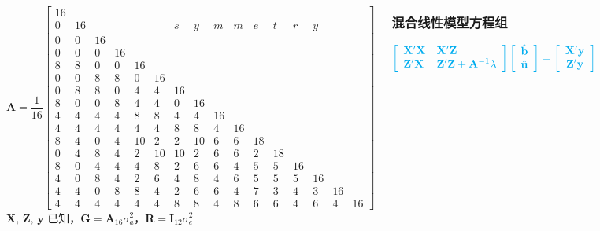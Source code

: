 \documentclass[serif,aspectratio=169]{beamer}
\begin{document}
\begin{frame}
\begin{columns}
\begin{frame}
  \begingroup
  \fontsize{8pt}{8pt}\selectfont
  $$
  \mathbf{A}=\frac{1}{16}\left[\begin{array}{rrrrrrrrrrrrrrrr}
      16\\
      0 & 16 &  &  &  & & s & y & m & m & e & t & r & y\\
      0 & 0 & 16\\
      0 & 0 & 0 & 16\\
      8 & 8 & 0 & 0 & 16\\
      0 & 0 & 8 & 8 & 0 & 16\\
      0 & 8 & 8 & 0 & 4 & 4 & 16\\
      8 & 0 & 0 & 8 & 4 & 4 & 0 & 16\\
      4 & 4 & 4 & 4 & 8 & 8 & 4 & 4 & 16\\
      4 & 4 & 4 & 4 & 4 & 4 & 8 & 8 & 4 & 16\\
      8 & 4 & 0 & 4 & 10 & 2 & 2 & 10 & 6 & 6 & 18\\
      0 & 4 & 8 & 4 & 2 & 10 & 10 & 2 & 6 & 6 & 2 & 18\\
      8 & 0 & 4 & 4 & 4 & 8 & 2 & 6 & 6 & 4 & 5 & 5 & 16\\
      4 & 0 & 8 & 4 & 2 & 6 & 4 & 8 & 4 & 6 & 5 & 5 & 5 & 16\\
      4 & 4 & 0 & 8 & 8 & 4 & 2 & 6 & 6 & 4 & 7 & 3 & 4 & 3 & 16\\
      4 & 4 & 4 & 4 & 4 & 4 & 8 & 8 & 4 & 8 & 6 & 6 & 4 & 6 & 4 & 16
    \end{array}\right]
  $$
  $\mathbf{X,\,Z,\,y}$ 已知，$\mathbf{G=A}_{16}\sigma_a^2$，$\mathbf{R=I}_{12}\sigma_e^2$
  \endgroup
\end{frame}


\begin{frame}
  \frametitle{混合线性模型方程组}
  $$
  \color{cyan}\left[\begin{array}{ll}
      \mathbf{X}'\mathbf{X} & \mathbf{X}'\mathbf{Z}\\
      \mathbf{Z}'\mathbf{X} & \mathbf{Z}'\mathbf{Z}+\mathbf{A}^{-1}\lambda
    \end{array}\right]
  \left[\begin{array}{cc}
      \hat{\mathbf{b}}\\
      \hat{\mathbf{u}}
    \end{array}\right] = 
  \left[\begin{array}{c}
      \mathbf{X}'\mathbf{y}\\
      \mathbf{Z}'\mathbf{y}
    \end{array}\right]
  $$
\end{frame}


\end{columns}
\end{frame}
\end{document}
